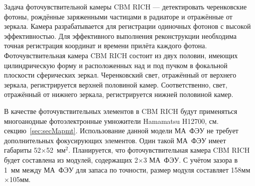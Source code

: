 Задача фоточувствительной камеры CBM RICH --- детектировать черенковские фотоны, рождённые заряженными частицами в радиаторе и отражённые от зеркала. Камера разрабатывается для регистрации одиночных фотонов с высокой эффективностью. Для эффективного выполнения реконструкции необходима точная регистрация координат и времени прилёта каждого фотона.
Фоточувствительная камера CBM RICH состоит из двух половин, имеющих цилиндрическую форму и расположенных над и под пучком в фокальной плоскости сферических зеркал. Черенковский свет, отражённый от верхнего зеркала, регистрируется верхней половиной камер. Соответственно, свет, отражённый от нижнего зеркала, регистрируется нижней половиной камер.

В качестве фоточувствительных элементов в CBM RICH будут применяться многоанодные фотоэлектронные умножители Hamamatsu H12700, см. секцию~\ref{sec:secMapmt}. Использование данной модели МА~ФЭУ не требует дополнительных фокусирующих элементов.
Один такой МА~ФЭУ имеет габариты 52$\times$52~мм$^2$.
Планируется, что фоточувствительная камера CBM RICH будет составлена из модулей, содержащих 2$\times$3 МА~ФЭУ.
С учётом зазора в 1~мм между МА~ФЭУ для запаса по точности, размер модуля составляет 158мм$\times$105мм.


